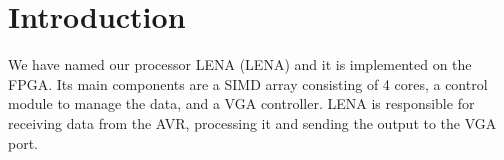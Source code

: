 \section{Introduction}

We have named our processor \acs{LENA} (\acl{LENA}) and it is implemented on the
\ac{FPGA}. Its main components are a \ac{SIMD} array consisting of 4 cores, a
control module to manage the data, and a \ac{VGA} controller. \ac{LENA} is
responsible for receiving data from the AVR, processing it and sending the
output to the \ac{VGA} port.
